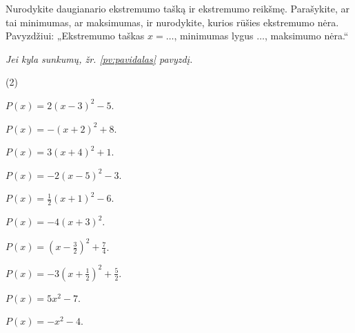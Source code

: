 \documentclass[11pt,a4paper]{scrartcl}
\makeatletter
\numberwithin{exercise}{section}
\renewenvironment{exercise}{\@thm{\th@definition}{exercise}{}}{\@endtheorem}
\newcommand{\pagalba}[1]{{\small\itshape Jei kyla sunkumų, žr. \ref{#1} pavyzdį.}}
\makeatother
\begin{document}
\begin{exercise}\label{uz:pavidalas}

Nurodykite daugianario ekstremumo tašką ir ekstremumo reikšmę. Parašykite, ar tai minimumas, ar maksimumas, ir nurodykite, kurios rūšies ekstremumo nėra. Pavyzdžiui: „Ekstremumo taškas $x=\ldots$, minimumas lygus $\ldots$, maksimumo nėra.“

\par\pagalba{pv:pavidalas}

\begin{tasks}[label=(\arabic*),label-width=2em](2)

\task $P(x)=2\left(x-3\right)^2-5$.

\task $P(x)=-\left(x+2\right)^2+8$.

\task $P(x)=3\left(x+4\right)^2+1$.

\task $P(x)=-2\left(x-5\right)^2-3$.

\task $P(x)=\frac{1}{2}\left(x+1\right)^2-6$.

\task $P(x)=-4\left(x+3\right)^2$.

\task $P(x)=\left(x-\frac{3}{2}\right)^2+\frac{7}{4}$.

\task $P(x)=-3\left(x+\frac{1}{2}\right)^2+\frac{5}{2}$.

\task $P(x)=5x^2-7$.

\task $P(x)=-x^2-4$.

\end{tasks}

\end{exercise}
\end{document}
